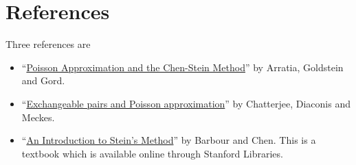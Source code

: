 \section{References}
Three references are 
\begin{itemize}
    \item ``\href{https://projecteuclid.org/journals/statistical-science/volume-5/issue-4/Poisson-Approximation-and-the-Chen-Stein-Method/10.1214/ss/1177012015.full}{Poisson Approximation and the Chen-Stein Method}'' by Arratia, Goldstein and Gord.
    \item ``\href{https://arxiv.org/abs/math/0411525}{Exchangeable pairs and Poisson approximation}'' by Chatterjee, Diaconis and Meckes.
    \item ``\href{https://searchworks.stanford.edu/view/12910822}{An Introduction to Stein's Method}'' by Barbour and Chen. This is a textbook which is available online through Stanford Libraries.
\end{itemize}

